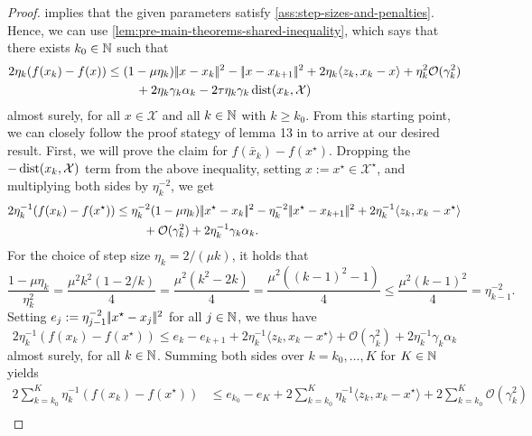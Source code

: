 \begin{proof}
     implies that the given parameters
    satisfy \cref{ass:step-sizes-and-penalties}. Hence, we can use
    \cref{lem:pre-main-theorems-shared-inequality}, which says that there exists $k_0\in\mathbb{N}$ such that
    \begin{align*}
        2\eta_k (f(x_{k}) - f(x))
        &\leq
        (1-\mu\eta_k)|\!|x - x_k|\!|^2 - |\!|x - x_{k+1}|\!|^2 + 2\eta_k\langle z_k, x_k - x \rangle
            + \eta_k^2 \mathcal{O}(\gamma_k^2) \\
            &\phantom{===} + 2\eta_k\gamma_k\alpha_k - 2\tau \eta_k \gamma_k \operatorname{dist}(x_k, \mathcal{X})
    \end{align*}
    almost surely, for all $x\in\mathcal{X}$ and all $k\in\mathbb{N}$ with $k\geq k_0$.
    From this starting point,
    we can closely follow the proof stategy of lemma 13 in \cite{nedich2023huber} to arrive
    at our desired result.
    First, we will prove the claim for $f(\bar{x}_k) - f(x^\star)$. Dropping the
    $-\operatorname{dist}(x_k,\mathcal{X})$ term from the above inequality,
    setting $x := x^\star \in \mathcal{X}^\star$,
    and multiplying both sides by $\eta_k^{-2}$, we get
    \begin{align*}
        2\eta_k^{-1} (f(x_{k}) - f(x^\star))
        &\leq
        \eta_k^{-2}(1-\mu\eta_k)|\!|x^\star - x_k|\!|^2 - \eta_k^{-2}|\!|x^\star - x_{k+1}|\!|^2
            + 2\eta_k^{-1}\langle z_k, x_k - x^\star \rangle \notag \\
            &\phantom{===} + \mathcal{O}(\gamma_k^2) + 2\eta_k^{-1}\gamma_k\alpha_k.
    \end{align*}
    For the choice of step size $\eta_k = 2/(\mu k)$, it holds that
    \[
        \frac{1 - \mu\eta_k}{\eta_k^2} = \frac{\mu^2 k^2 (1 - 2/k)}{4}
        = \frac{\mu^2 (k^2 - 2k)}{4} = \frac{\mu^2 ((k - 1)^2 - 1)}{4}
        \leq \frac{\mu^2 (k - 1)^2}{4}
        = \eta_{k-1}^{-2}.
    \]
    Setting $e_j := \eta_{j-1}^{-2} |\!|x^\star - x_j|\!|^2$ for all $j\in\mathbb{N}$, we thus have
    \[
        2\eta_k^{-1} (f(x_{k}) - f(x^\star))
        \leq
        e_k - e_{k+1} + 2\eta_k^{-1}\langle z_k, x_k - x^\star \rangle + \mathcal{O}(\gamma_k^2)
            + 2\eta_k^{-1}\gamma_k\alpha_k
    \]
    almost surely, for all $k\in\mathbb{N}$.
    Summing both sides over $k = k_0,\dots,K$ for $K\in\mathbb{N}$ yields
    \begin{align*}
        2\sum_{k=k_0}^{K} \eta_k^{-1} (f(x_{k}) - f(x^\star))
        &\leq
        e_{k_0} - e_{K} + 2\sum_{k=k_0}^K \eta_k^{-1}\langle z_k, x_k - x^\star \rangle + 2\sum_{k=k_0}^{K} \mathcal{O}(\gamma_k^2) \\

\end{align*}
\end{proof}
